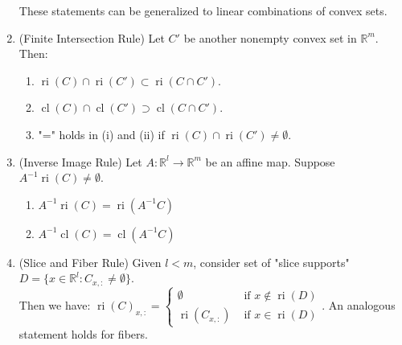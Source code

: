 \begin{prop}
\begin{enumerate}[label=(\alph*)]
		      These statements can be generalized to linear combinations of convex sets.
		\item (Finite Intersection Rule) Let $C'$ be another nonempty convex set in $\mathbb{R}^m$. Then:
		      \begin{enumerate}[label=(\roman*)]
			      \item $\operatorname{ri}(C)\cap\operatorname{ri}(C')\subset\operatorname{ri}(C\cap C')$.
			      \item $\operatorname{cl}(C)\cap\operatorname{cl}(C')\supset\operatorname{cl}(C\cap C')$.
			      \item "=" holds in (i) and (ii) if $\operatorname{ri}(C)\cap\operatorname{ri}(C')\neq\emptyset$.
		      \end{enumerate}
		\item (Inverse Image Rule) Let $A:\mathbb{R}^l\to \mathbb{R}^m$ be an affine map. Suppose $A^{-1}\operatorname{ri}(C)\neq \emptyset$.
		      \begin{enumerate}[label=(\roman*)]
			      \item $A^{-1}\operatorname{ri}(C)=\operatorname{ri}(A^{-1}C)$
			      \item $A^{-1}\operatorname{cl}(C)=\operatorname{cl}(A^{-1}C)$
		      \end{enumerate}
		\item (Slice and Fiber Rule) Given $l< m$, consider set of "slice supports" $D=\{x\in \mathbb{R}^l:C_{x,:}\neq\emptyset\}$.\\
		      Then we have:
		      $\operatorname{ri}(C)_{x,:}=
			      \begin{cases}
				      \emptyset                  & \text{ if }x\notin \operatorname{ri}(D) \\
				      \operatorname{ri}(C_{x,:}) & \text{ if }x\in \operatorname{ri}(D)
			      \end{cases}$. An analogous statement holds for fibers.
	\end{enumerate}
\end{prop}


